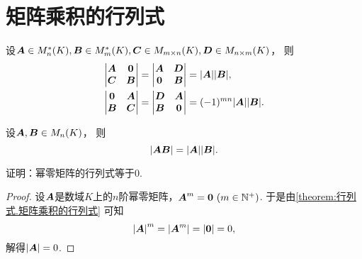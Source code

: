 \section{矩阵乘积的行列式}
\begin{lemma}
设\(\boldsymbol{A}\in M_n^*(K),
\boldsymbol{B}\in M_m^*(K),
\boldsymbol{C}\in M_{m\times n}(K),
\boldsymbol{D}\in M_{n\times m}(K)\)，
则\begin{align}
	\begin{vmatrix}
		\boldsymbol{A} & \boldsymbol0 \\
		\boldsymbol{C} & \boldsymbol{B}
	\end{vmatrix}
	&= \begin{vmatrix}
		\boldsymbol{A} & \boldsymbol{D} \\
		\boldsymbol0 & \boldsymbol{B}
	\end{vmatrix}
	= \abs{\boldsymbol{A}} \abs{\boldsymbol{B}}, \label{equation:行列式.广义三角阵的行列式1} \\
	\begin{vmatrix}
		\boldsymbol0 & \boldsymbol{A} \\
		\boldsymbol{B} & \boldsymbol{C}
	\end{vmatrix}
	&= \begin{vmatrix}
		\boldsymbol{D} & \boldsymbol{A} \\
		\boldsymbol{B} & \boldsymbol0
	\end{vmatrix}
	= (-1)^{mn} \abs{\boldsymbol{A}} \abs{\boldsymbol{B}}. \label{equation:行列式.广义三角阵的行列式2}
\end{align}
\end{lemma}

\begin{theorem}[矩阵乘积的行列式定理]\label{theorem:行列式.矩阵乘积的行列式}
设\(\boldsymbol{A},\boldsymbol{B}\in M_n(K)\)，
则\begin{equation}
	\abs{\boldsymbol{A} \boldsymbol{B}} = \abs{\boldsymbol{A}} \abs{\boldsymbol{B}}.
\end{equation}
\end{theorem}

\begin{example}\label{example:幂零矩阵.幂零矩阵的行列式}
证明：幂零矩阵的行列式等于\(0\).
\begin{proof}
设\(\boldsymbol{A}\)是数域\(K\)上的\(n\)阶幂零矩阵，\(\boldsymbol{A}^m = \boldsymbol0\ (m\in\mathbb{N}^+)\).
于是由\cref{theorem:行列式.矩阵乘积的行列式} 可知\begin{equation*}
	\abs{\boldsymbol{A}}^m
	= \abs{\boldsymbol{A}^m}
	= \abs{\boldsymbol0}
	= 0,
\end{equation*}
解得\(\abs{\boldsymbol{A}} = 0\).
\end{proof}
\end{example}

